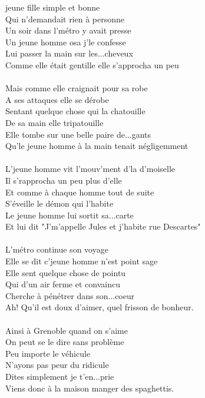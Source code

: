 
 jeune fille simple et bonne
\\Qui n'demandait rien à personne
\\Un soir dans l'métro y avait presse
\\Un jeune homme osa j'le confesse
\\Lui passer la main sur les...cheveux
\\Comme elle était gentille elle s'approcha un peu
\\\\Mais comme elle craignait pour sa robe
\\A ses attaques elle se dérobe
\\Sentant quelque chose qui la chatouille
\\De sa main elle tripatouille
\\Elle tombe sur une belle paire de...gants
\\Qu'le jeune homme à la main tenait négligemment
\\\\L'jeune homme vit l'mouv'ment d'la d'moiselle
\\Il s'rapprocha un peu plus d'elle
\\Et comme à chaque homme tout de suite
\\S'éveille le démon qui l'habite
\\Le jeune homme lui sortit sa...carte
\\Et lui dit "J'm'appelle Jules et j'habite rue Descartes"
\\\\L'métro continue son voyage
\\Elle se dit c'jeune homme n'est point sage
\\Elle sent quelque chose de pointu
\\Qui d'un air ferme et convaincu
\\Cherche à pénétrer dans son...coeur
\\Ah! Qu'il est doux d'aimer, quel frisson de bonheur.
\\\\Ainsi à Grenoble quand on s'aime %
\\On peut se le dire sans problème
\\Peu importe le véhicule
\\N'ayons pas peur du ridicule
\\Dites simplement je t'en...prie
\\Viens donc à la maison manger des spaghettis.
\\
\breakpage